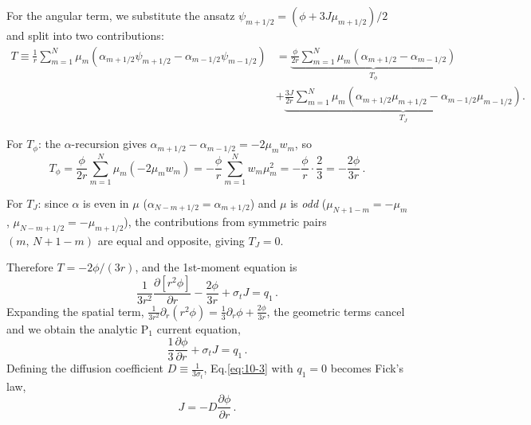 \begin{mybox}
  For the angular term, we substitute the ansatz $\psi_{m+1/2} = (\phi + 3J\mu_{m+1/2})/2$ and split into two contributions:
  \begin{align*}
    T \equiv \frac{1}{r}\sum_{m=1}^N \mu_m\left(\alpha_{m+1/2}\psi_{m+1/2} - \alpha_{m-1/2}\psi_{m-1/2}\right)
    &= \underbrace{\frac{\phi}{2r}\sum_{m=1}^N \mu_m\!\left(\alpha_{m+1/2}-\alpha_{m-1/2}\right)}_{T_\phi}\\
    &+ \underbrace{\frac{3J}{2r}\sum_{m=1}^N \mu_m\!\left(\alpha_{m+1/2}\mu_{m+1/2}-\alpha_{m-1/2}\mu_{m-1/2}\right)}_{T_J}.
  \end{align*}

  For $T_\phi$: the $\alpha$-recursion gives $\alpha_{m+1/2} - \alpha_{m-1/2} = -2\mu_m w_m$, so
  \begin{equation*}
    T_\phi = \frac{\phi}{2r}\sum_{m=1}^N \mu_m(-2\mu_m w_m) = -\frac{\phi}{r}\sum_{m=1}^N w_m\mu_m^2 = -\frac{\phi}{r}\cdot\frac{2}{3} = -\frac{2\phi}{3r}\,.
  \end{equation*}

  For $T_J$: since $\alpha$ is even in $\mu$ ($\alpha_{N-m+1/2}=\alpha_{m+1/2}$) and $\mu$ is \emph{odd} ($\mu_{N+1-m}=-\mu_m$, $\mu_{N-m+1/2}=-\mu_{m+1/2}$), the contributions from symmetric pairs $(m,\,N+1-m)$ are equal and opposite, giving $T_J = 0$.

  Therefore $T = -2\phi/(3r)$, and the 1st-moment equation is
  \begin{equation*}
    \frac{1}{3r^2}\frac{\partial[r^2\phi]}{\partial r} - \frac{2\phi}{3r} + \sigma_t J = q_1\,.
  \end{equation*}
  Expanding the spatial term, $\tfrac{1}{3r^2}\partial_r(r^2\phi) = \tfrac{1}{3}\partial_r\phi + \tfrac{2\phi}{3r}$, the geometric terms cancel and we obtain the analytic P$_1$ current equation,
  \begin{equation}
    \frac{1}{3}\frac{\partial\phi}{\partial r} + \sigma_t J = q_1\,. \label{eq:10-3}
  \end{equation}
  Defining the diffusion coefficient $D \equiv \tfrac{1}{3\sigma_t}$, Eq.\eqref{eq:10-3} with $q_1=0$ becomes Fick's law,
  \begin{equation}
    J = -D\frac{\partial\phi}{\partial r}\,. \label{eq:fick}
  \end{equation}

\end{mybox}

